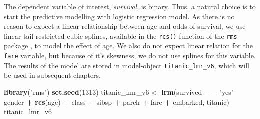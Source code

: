 \documentclass[12pt,]{krantz}
\newenvironment{Shaded}{\begin{snugshade}}{\end{snugshade}}
\newcommand{\DecValTok}[1]{\textcolor[rgb]{0.00,0.00,0.81}{#1}}
\newcommand{\KeywordTok}[1]{\textcolor[rgb]{0.13,0.29,0.53}{\textbf{#1}}}
\newcommand{\NormalTok}[1]{#1}
\newcommand{\OperatorTok}[1]{\textcolor[rgb]{0.81,0.36,0.00}{\textbf{#1}}}
\newcommand{\StringTok}[1]{\textcolor[rgb]{0.31,0.60,0.02}{#1}}
\begin{document}
The dependent variable of interest, \emph{survival}, is binary. Thus, a natural choice is to start the predictive modelling with logistic regression model. As there is no reason to expect a linear relationship between age and odds of survival, we use linear tail-restricted cubic splines, available in the \texttt{rcs()} function of the \texttt{rms} package \citep{rms}, to model the effect of age. We also do not expect linear relation for the \texttt{fare} variable, but because of it's skewness, we do not use splines for this variable. The results of the model are stored in model-object \texttt{titanic\_lmr\_v6}, which will be used in subsequent chapters.

\begin{Shaded}
\begin{Highlighting}[]
\KeywordTok{library}\NormalTok{(}\StringTok{"rms"}\NormalTok{)}
\KeywordTok{set.seed}\NormalTok{(}\DecValTok{1313}\NormalTok{)}
\NormalTok{titanic_lmr_v6 <-}\StringTok{ }\KeywordTok{lrm}\NormalTok{(survived }\OperatorTok{==}\StringTok{ "yes"} \OperatorTok{~}\StringTok{ }\NormalTok{gender }\OperatorTok{+}\StringTok{ }\KeywordTok{rcs}\NormalTok{(age) }\OperatorTok{+}\StringTok{ }\NormalTok{class }\OperatorTok{+}\StringTok{ }\NormalTok{sibsp }\OperatorTok{+}
\StringTok{                   }\NormalTok{parch }\OperatorTok{+}\StringTok{ }\NormalTok{fare }\OperatorTok{+}\StringTok{ }\NormalTok{embarked, titanic)}
\NormalTok{titanic_lmr_v6}
\end{Highlighting}
\end{Shaded}
\end{document}
